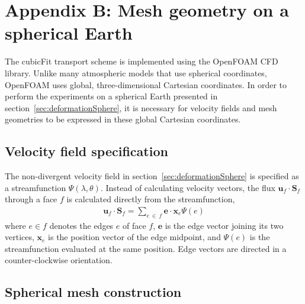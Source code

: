 \section*{Appendix B: Mesh geometry on a spherical Earth}

The cubicFit transport scheme is implemented using the OpenFOAM CFD library.  Unlike many atmospheric models that use spherical coordinates, OpenFOAM uses global, three-dimensional Cartesian coordinates.  In order to perform the experiments on a spherical Earth presented in section~\ref{sec:deformationSphere}, it is necessary for velocity fields and mesh geometries to be expressed in these global Cartesian coordinates.

\subsection*{Velocity field specification}
The non-divergent velocity field in section~\ref{sec:deformationSphere} is specified as a streamfunction $\Psi(\lambda, \theta)$.  Instead of calculating velocity vectors, the flux $\mathbf{u}_f \cdot \mathbf{S}_f$ through a face $f$ is calculated directly from the streamfunction,
\begin{align}
	\mathbf{u}_f \cdot \mathbf{S}_f	= \sum_{e\:\in\:f} \mathbf{e} \cdot \mathbf{x}_e \Psi(e) \label{eqn:nondiv-spherical-flux}
\end{align}
where $e \in f$ denotes the edges $e$ of face $f$, $\mathbf{e}$ is the edge vector joining its two vertices, $\mathbf{x}_e$ is the position vector of the edge midpoint, and $\Psi(e)$ is the streamfunction evaluated at the same position.
Edge vectors are directed in a counter-clockwise orientation.

\subsection*{Spherical mesh construction}

